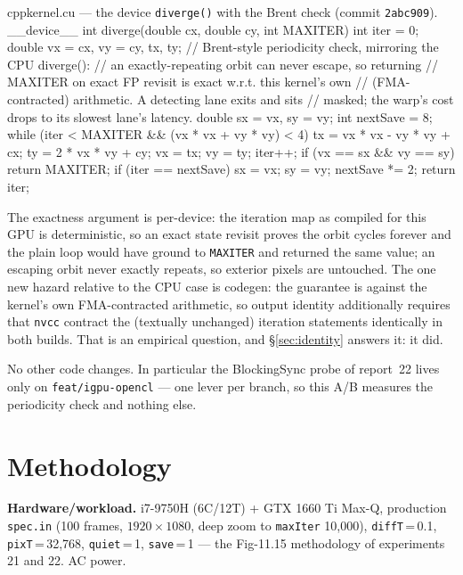 \documentclass[
	english,
	letterpaper, oneside
]{article}
\begin{document}
\begin{sourcecode}{cpp}{kernel.cu --- the device \texttt{diverge()} with the Brent check (commit \texttt{2abc909}).}
__device__ int diverge(double cx, double cy, int MAXITER) {
  int iter = 0;
  double vx = cx, vy = cy, tx, ty;
  // Brent-style periodicity check, mirroring the CPU diverge():
  // an exactly-repeating orbit can never escape, so returning
  // MAXITER on exact FP revisit is exact w.r.t. this kernel's own
  // (FMA-contracted) arithmetic. A detecting lane exits and sits
  // masked; the warp's cost drops to its slowest lane's latency.
  double sx = vx, sy = vy;
  int nextSave = 8;
  while (iter < MAXITER && (vx * vx + vy * vy) < 4) {
    tx = vx * vx - vy * vy + cx;
    ty = 2 * vx * vy + cy;
    vx = tx;
    vy = ty;
    iter++;
    if (vx == sx && vy == sy)
      return MAXITER;
    if (iter == nextSave) {
      sx = vx;
      sy = vy;
      nextSave *= 2;
    }
  }
  return iter;
}
\end{sourcecode}

The exactness argument is per-device: the iteration map as compiled for
this GPU is deterministic, so an exact state revisit proves the orbit
cycles forever and the plain loop would have ground to \texttt{MAXITER} and
returned the same value; an escaping orbit never exactly repeats, so
exterior pixels are untouched. The one new hazard relative to the CPU case
is codegen: the guarantee is against the kernel's own FMA-contracted
arithmetic, so output identity additionally requires that \texttt{nvcc}
contract the (textually unchanged) iteration statements identically in both
builds. That is an empirical question, and \S\ref{sec:identity} answers it:
it did.

No other code changes. In particular the BlockingSync probe of report~22
lives only on \texttt{feat/igpu-opencl} --- one lever per branch, so this A/B
measures the periodicity check and nothing else.

\section{Methodology}
\label{sec:method}

\textbf{Hardware/workload.} i7-9750H (6C/12T) + GTX 1660 Ti Max-Q,
production \texttt{spec.in} (100 frames, $1920\times1080$, deep zoom to
\texttt{maxIter} 10{,}000), \texttt{diffT}\,=\,0.1,
\texttt{pixT}\,=\,32{,}768, \texttt{quiet}\,=\,1, \texttt{save}\,=\,1 ---
the Fig-11.15 methodology of experiments 21 and 22. AC power.
\end{document}

